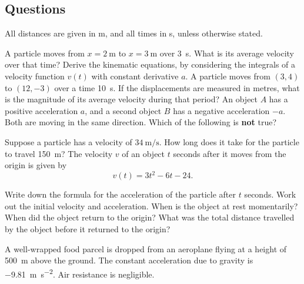 \subsection*{Questions}
All distances are given in \si{\metre}, and all times in \si{\second}, unless otherwise stated.
\begin{questions}
  \questioA A particle moves from $ x = \SI{2}{\metre} $ to $ x = \SI{3}{\metre} $ over \SI{3}{\second}. What is its average velocity over that time?
  \questioM Derive the kinematic equations, by considering the integrals of a velocity function $ v(t) $ with constant derivative $ a $.
  \questioA A particle moves from $ (3,4) $ to $ (12,-3) $ over a time \SI{10}{\second}. If the displacements are measured in metres, what is the magnitude of
            its average velocity during that period?
  \questioA An object $ A $ has a positive acceleration $ a $, and a second object $ B $ has a negative acceleration $ -a $. Both are moving in the
            same direction. Which of the following is \textbf{not} true?
  \questioA Suppose a particle has a velocity of $ \SI{34}{\metre\per\second} $. How long does it take for the particle to travel \SI{150}{\metre}?
  \question The velocity $ v $ of an object $ t $ seconds after it moves from the origin is given by
            \begin{displaymath}
              v(t) = 3t^2 - 6t - 24.
            \end{displaymath}
    \begin{parts}
      \parA Write down the formula for the acceleration of the particle after $ t $ seconds.
      \parA Work out the initial velocity and acceleration.
      \parA When is the object at rest momentarily?
      \parM When did the object return to the origin?
      \parE What was the total distance travelled by the object before it returned to the origin?
    \end{parts}
  \questioA A well-wrapped food parcel is dropped from an aeroplane flying at a height of \SI{500}{\metre}
            above the ground. The constant acceleration due to gravity is \SI{-9.81}{\metre\per\second\squared}. Air resistance
            is negligible.
    \begin{parts}

\end{parts}
\end{questions}
